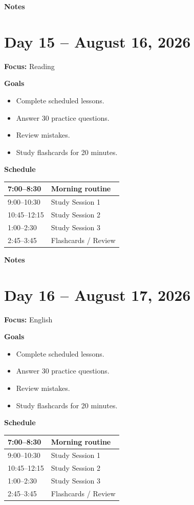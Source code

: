 \vspace{1em}
\textbf{Notes}

\vspace{8cm}

\newpage

\section*{Day 15 -- August 16, 2026}
\textbf{Focus:} Reading

\textbf{Goals}
\begin{itemize}
\item Complete scheduled lessons.
\item Answer 30 practice questions.
\item Review mistakes.
\item Study flashcards for 20 minutes.
\end{itemize}

\textbf{Schedule}
\begin{tabular}{|p{4cm}|p{10cm}|}\hline
7:00--8:30 & Morning routine \\\hline
9:00--10:30 & Study Session 1 \\\hline
10:45--12:15 & Study Session 2 \\\hline
1:00--2:30 & Study Session 3 \\\hline
2:45--3:45 & Flashcards / Review \\\hline
\end{tabular}

\vspace{1em}
\textbf{Notes}

\vspace{8cm}

\newpage

\section*{Day 16 -- August 17, 2026}
\textbf{Focus:} English

\textbf{Goals}
\begin{itemize}
\item Complete scheduled lessons.
\item Answer 30 practice questions.
\item Review mistakes.
\item Study flashcards for 20 minutes.
\end{itemize}

\textbf{Schedule}
\begin{tabular}{|p{4cm}|p{10cm}|}\hline
7:00--8:30 & Morning routine \\\hline
9:00--10:30 & Study Session 1 \\\hline
10:45--12:15 & Study Session 2 \\\hline
1:00--2:30 & Study Session 3 \\\hline
2:45--3:45 & Flashcards / Review \\\hline
\end{tabular}

